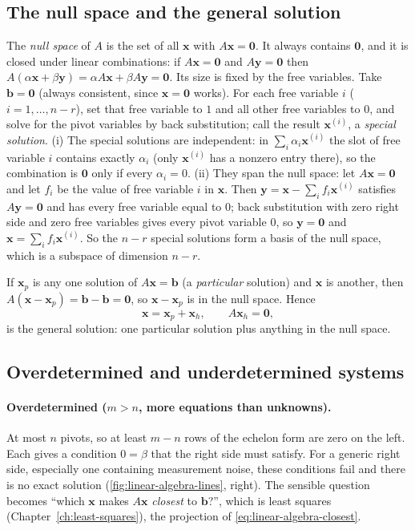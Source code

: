 \subsection{The null space and the general solution}

The \emph{null space} of $A$ is the set of all $\bm x$ with $A\bm x=\bm 0$. It always contains $\bm 0$, and it is closed under linear combinations: if $A\bm x=\bm 0$ and $A\bm y=\bm 0$ then $A(\alpha\bm x+\beta\bm y)=\alpha A\bm x+\beta A\bm y=\bm 0$. Its size is fixed by the free variables. Take $\bm b=\bm 0$ (always consistent, since $\bm x=\bm 0$ works). For each free variable $i$ ($i=1,\dots,n-r$), set that free variable to $1$ and all other free variables to $0$, and solve for the pivot variables by back substitution; call the result $\bm x^{(i)}$, a \emph{special solution}. (i) The special solutions are independent: in $\sum_i\alpha_i\bm x^{(i)}$ the slot of free variable $i$ contains exactly $\alpha_i$ (only $\bm x^{(i)}$ has a nonzero entry there), so the combination is $\bm 0$ only if every $\alpha_i=0$. (ii) They span the null space: let $A\bm x=\bm 0$ and let $f_i$ be the value of free variable $i$ in $\bm x$. Then $\bm y=\bm x-\sum_if_i\bm x^{(i)}$ satisfies $A\bm y=\bm 0$ and has every free variable equal to $0$; back substitution with zero right side and zero free variables gives every pivot variable $0$, so $\bm y=\bm 0$ and $\bm x=\sum_if_i\bm x^{(i)}$. So the $n-r$ special solutions form a basis of the null space, which is a subspace of dimension $n-r$.

If $\bm x_p$ is any one solution of $A\bm x=\bm b$ (a \emph{particular} solution) and $\bm x$ is another, then $A(\bm x-\bm x_p)=\bm b-\bm b=\bm 0$, so $\bm x-\bm x_p$ is in the null space. Hence
\begin{equation}
\bm x=\bm x_p+\bm x_h,\qquad A\bm x_h=\bm 0 ,
\label{eq:linear-algebra-general}
\end{equation}
is the general solution: one particular solution plus anything in the null space.

\subsection{Overdetermined and underdetermined systems}

\paragraph{Overdetermined ($m>n$, more equations than unknowns).} At most $n$ pivots, so at least $m-n$ rows of the echelon form are zero on the left. Each gives a condition $0=\beta$ that the right side must satisfy. For a generic right side, especially one containing measurement noise, these conditions fail and there is no exact solution (\cref{fig:linear-algebra-lines}, right). The sensible question becomes ``which $\bm x$ makes $A\bm x$ \emph{closest} to $\bm b$?'', which is least squares (Chapter~\ref{ch:least-squares}), the projection of \cref{eq:linear-algebra-closest}.

